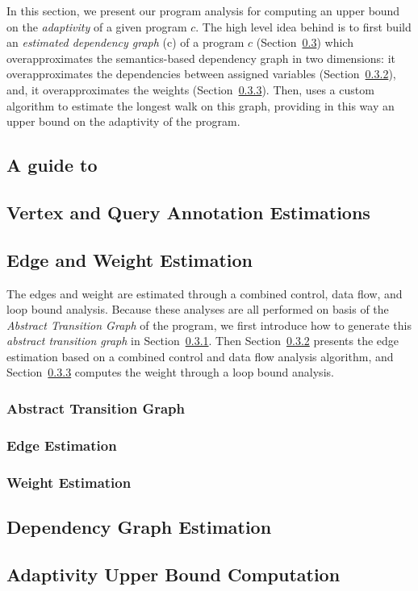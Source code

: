 In this section, we present our program analysis {\THESYSTEM} for
computing an upper bound on the \emph{adaptivity} of a given program
$c$.  The high level idea behind {\THESYSTEM} is to first build
an \emph{estimated dependency graph} \progG(c) of a program $c$
(Section~\ref{sec:alg_weightedgegen}) which overapproximates the
semantics-based dependency graph in two dimensions: it
overapproximates the dependencies between assigned variables (Section~\ref{sec:alg_edgegen}), and, it
overapproximates the weights (Section~\ref{sec:alg_weightgen}). Then, {\THESYSTEM} uses a custom algorithm to estimate the longest
walk on this graph, providing in this way an upper bound on the adaptivity of the
program.
%
\subsection{A guide to {\THESYSTEM}}
\label{sec:alg_guide}


\subsection{Vertex and Query Annotation Estimations}
\label{sec:alg_vertexgen}



\subsection{Edge and Weight Estimation}
\label{sec:alg_weightedgegen}
The edges and weight are estimated through a combined control, data flow, and loop bound analysis.
Because these analyses are all performed on basis of the \emph{Abstract Transition Graph} of the program, we first introduce how to generate this \emph{abstract transition graph} in Section~\ref{sec:alg_abscfg}.
Then Section~\ref{sec:alg_edgegen} presents the edge estimation based on a combined control and data flow analysis algorithm,
and Section~\ref{sec:alg_weightgen}
computes the weight through a loop bound analysis.

\subsubsection{Abstract Transition Graph}
\label{sec:alg_abscfg}

%
\subsubsection{Edge Estimation}
\label{sec:alg_edgegen}

%

\subsubsection{Weight Estimation}
\label{sec:alg_weightgen}

%
%
\subsection{Dependency Graph Estimation}
\label{sec:alg_graphgen}


\subsection{Adaptivity Upper Bound Computation}
\label{sec:alg_adaptcompute}

